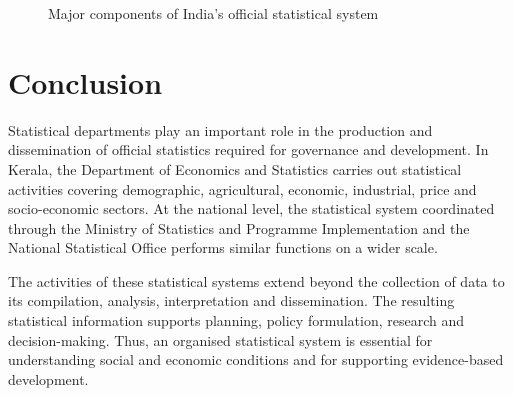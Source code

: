 \documentclass[12pt,a4paper]{article}
\begin{document}
\begin{figure}[H]
\centering


\caption{Major components of India's official statistical system}
\label{fig:india-statistical-system}

\end{figure}

\section{Conclusion}

Statistical departments play an important role in the production and dissemination of official statistics required for governance and development. In Kerala, the Department of Economics and Statistics carries out statistical activities covering demographic, agricultural, economic, industrial, price and socio-economic sectors. At the national level, the statistical system coordinated through the Ministry of Statistics and Programme Implementation and the National Statistical Office performs similar functions on a wider scale.

The activities of these statistical systems extend beyond the collection of data to its compilation, analysis, interpretation and dissemination. The resulting statistical information supports planning, policy formulation, research and decision-making. Thus, an organised statistical system is essential for understanding social and economic conditions and for supporting evidence-based development.
\end{document}
